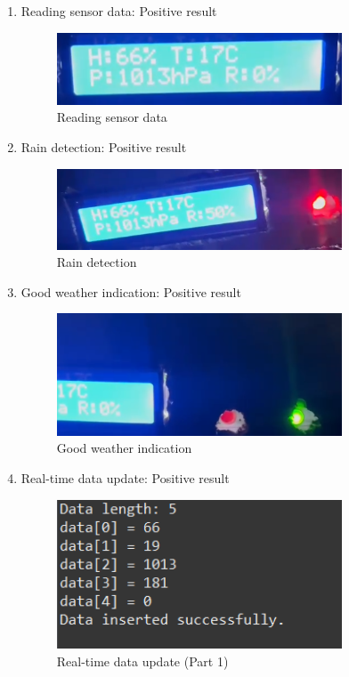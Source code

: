 \documentclass[a4paper,12pt]{article}
\begin{document}
\begin{enumerate}
	\item Reading sensor data: Positive result
	\begin{figure}[H]
		\centering
		\includegraphics[width=0.8\textwidth]{DTU1.png}
		\caption{Reading sensor data}
		\label{fig:reading_sensor_data}
	\end{figure}
	
	\item Rain detection: Positive result
	\begin{figure}[H]
		\centering
		\includegraphics[width=0.8\textwidth]{DTU2.png}
		\caption{Rain detection}
		\label{fig:rain_detection}
	\end{figure}
	
	\item Good weather indication: Positive result
	\begin{figure}[H]
		\centering
		\includegraphics[width=0.8\textwidth]{DTU3.png}
		\caption{Good weather indication}
		\label{fig:good_weather}
	\end{figure}
	
	\item Real-time data update: Positive result
	\begin{figure}[H]
		\centering
		\includegraphics[width=0.8\textwidth]{DTU4(1).png}
		\caption{Real-time data update (Part 1)}
		\label{fig:real_time_update1}
	\end{figure}
	

\end{enumerate}
\end{document}
